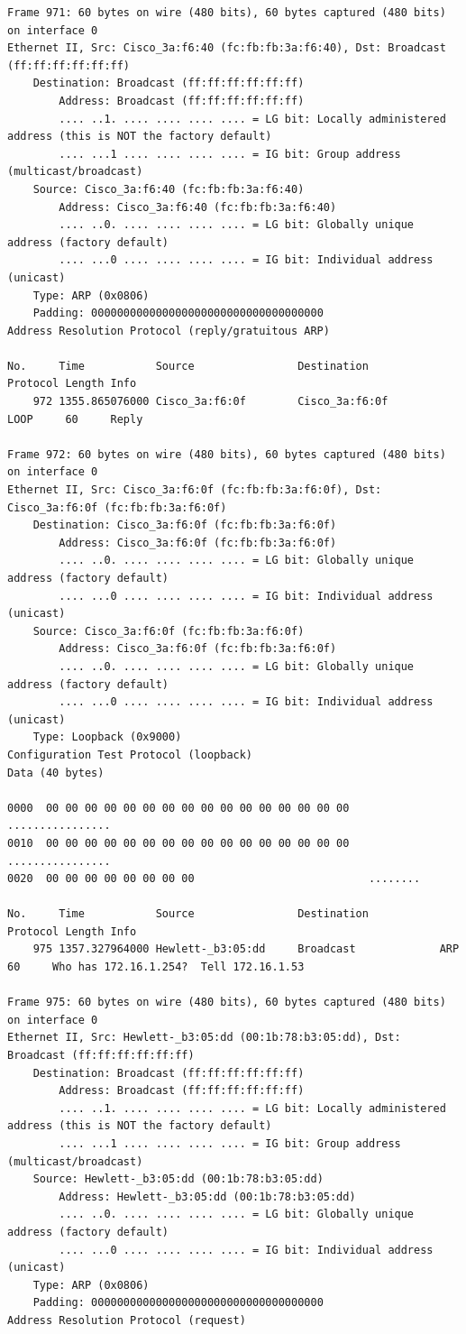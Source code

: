\documentclass[a4paper,11pt]{article}
\begin{document}
\begin{lstlisting}
Frame 971: 60 bytes on wire (480 bits), 60 bytes captured (480 bits) on interface 0
Ethernet II, Src: Cisco_3a:f6:40 (fc:fb:fb:3a:f6:40), Dst: Broadcast (ff:ff:ff:ff:ff:ff)
    Destination: Broadcast (ff:ff:ff:ff:ff:ff)
        Address: Broadcast (ff:ff:ff:ff:ff:ff)
        .... ..1. .... .... .... .... = LG bit: Locally administered address (this is NOT the factory default)
        .... ...1 .... .... .... .... = IG bit: Group address (multicast/broadcast)
    Source: Cisco_3a:f6:40 (fc:fb:fb:3a:f6:40)
        Address: Cisco_3a:f6:40 (fc:fb:fb:3a:f6:40)
        .... ..0. .... .... .... .... = LG bit: Globally unique address (factory default)
        .... ...0 .... .... .... .... = IG bit: Individual address (unicast)
    Type: ARP (0x0806)
    Padding: 000000000000000000000000000000000000
Address Resolution Protocol (reply/gratuitous ARP)

No.     Time           Source                Destination           Protocol Length Info
    972 1355.865076000 Cisco_3a:f6:0f        Cisco_3a:f6:0f        LOOP     60     Reply

Frame 972: 60 bytes on wire (480 bits), 60 bytes captured (480 bits) on interface 0
Ethernet II, Src: Cisco_3a:f6:0f (fc:fb:fb:3a:f6:0f), Dst: Cisco_3a:f6:0f (fc:fb:fb:3a:f6:0f)
    Destination: Cisco_3a:f6:0f (fc:fb:fb:3a:f6:0f)
        Address: Cisco_3a:f6:0f (fc:fb:fb:3a:f6:0f)
        .... ..0. .... .... .... .... = LG bit: Globally unique address (factory default)
        .... ...0 .... .... .... .... = IG bit: Individual address (unicast)
    Source: Cisco_3a:f6:0f (fc:fb:fb:3a:f6:0f)
        Address: Cisco_3a:f6:0f (fc:fb:fb:3a:f6:0f)
        .... ..0. .... .... .... .... = LG bit: Globally unique address (factory default)
        .... ...0 .... .... .... .... = IG bit: Individual address (unicast)
    Type: Loopback (0x9000)
Configuration Test Protocol (loopback)
Data (40 bytes)

0000  00 00 00 00 00 00 00 00 00 00 00 00 00 00 00 00   ................
0010  00 00 00 00 00 00 00 00 00 00 00 00 00 00 00 00   ................
0020  00 00 00 00 00 00 00 00                           ........

No.     Time           Source                Destination           Protocol Length Info
    975 1357.327964000 Hewlett-_b3:05:dd     Broadcast             ARP      60     Who has 172.16.1.254?  Tell 172.16.1.53

Frame 975: 60 bytes on wire (480 bits), 60 bytes captured (480 bits) on interface 0
Ethernet II, Src: Hewlett-_b3:05:dd (00:1b:78:b3:05:dd), Dst: Broadcast (ff:ff:ff:ff:ff:ff)
    Destination: Broadcast (ff:ff:ff:ff:ff:ff)
        Address: Broadcast (ff:ff:ff:ff:ff:ff)
        .... ..1. .... .... .... .... = LG bit: Locally administered address (this is NOT the factory default)
        .... ...1 .... .... .... .... = IG bit: Group address (multicast/broadcast)
    Source: Hewlett-_b3:05:dd (00:1b:78:b3:05:dd)
        Address: Hewlett-_b3:05:dd (00:1b:78:b3:05:dd)
        .... ..0. .... .... .... .... = LG bit: Globally unique address (factory default)
        .... ...0 .... .... .... .... = IG bit: Individual address (unicast)
    Type: ARP (0x0806)
    Padding: 000000000000000000000000000000000000
Address Resolution Protocol (request)


\end{lstlisting}
\end{document}
